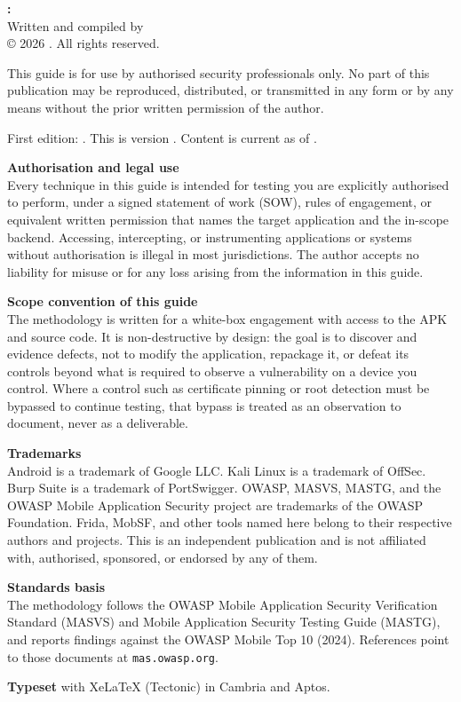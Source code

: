 \thispagestyle{empty}
{\small
\textbf{\guidetitle: \guidesubtitle}\\
Written and compiled by \guideauthor\\
© 2026 \guideauthor. All rights reserved.

This guide is for use by authorised security professionals only. No part of this publication may be reproduced, distributed, or transmitted in any form or by any means without the prior written permission of the author.

First edition: \guidedate. This is version \guideversion. Content is current as of \guidecurrency.

\medskip
\textbf{Authorisation and legal use}\\
Every technique in this guide is intended for testing you are explicitly authorised to perform, under a signed statement of work (SOW), rules of engagement, or equivalent written permission that names the target application and the in-scope backend. Accessing, intercepting, or instrumenting applications or systems without authorisation is illegal in most jurisdictions. The author accepts no liability for misuse or for any loss arising from the information in this guide.

\medskip
\textbf{Scope convention of this guide}\\
The methodology is written for a white-box engagement with access to the APK and source code. It is non-destructive by design: the goal is to discover and evidence defects, not to modify the application, repackage it, or defeat its controls beyond what is required to observe a vulnerability on a device you control. Where a control such as certificate pinning or root detection must be bypassed to continue testing, that bypass is treated as an observation to document, never as a deliverable.

\medskip
\textbf{Trademarks}\\
Android is a trademark of Google LLC. Kali Linux is a trademark of OffSec. Burp Suite is a trademark of PortSwigger. OWASP, MASVS, MASTG, and the OWASP Mobile Application Security project are trademarks of the OWASP Foundation. Frida, MobSF, and other tools named here belong to their respective authors and projects. This is an independent publication and is not affiliated with, authorised, sponsored, or endorsed by any of them.

\medskip
\textbf{Standards basis}\\
The methodology follows the OWASP Mobile Application Security Verification Standard (MASVS) and Mobile Application Security Testing Guide (MASTG), and reports findings against the OWASP Mobile Top 10 (2024). References point to those documents at \texttt{mas.owasp.org}.

\medskip
\textbf{Typeset} with XeLaTeX (Tectonic) in Cambria and Aptos.
}
\clearpage

